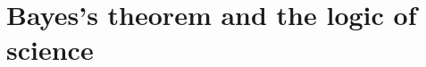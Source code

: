 \documentclass [12pt,letter]{article}
\theoremstyle{plain}
\theoremstyle{plain}
\theoremstyle{definition}
\theoremstyle{definition}
\numberwithin{equation}{section}
\begin{document}
\section{Bayes's theorem and the logic of science}
\label{sec:bayes_logic}

%
%
% 
%
%
% 
%
%
% 
%
%
% 
%
%
% 
%
%
\end{document}
